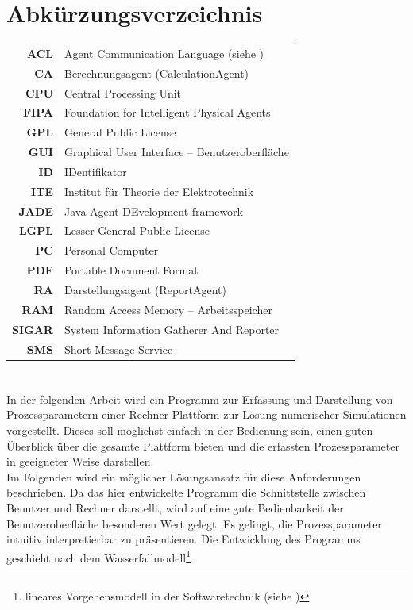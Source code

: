 \documentclass[a4paper,12pt,oneside,openright,onecolumn,final,titlepage,fleqn,ngerman]{scrreprt}
\newcommand{\parag}{\\[2ex]}
\newcommand{\abkEntry}[2]{\textbf{#1} & #2\\}
\newcommand{\calcag}{Berechnungsagent}
\newcommand{\repag}{Darstellungsagent}
\begin{document}
	\chapter*{Abkürzungsverzeichnis}
	\begin{longtable}{rl}
		\abkEntry{ACL}{Agent Communication Language (siehe \citeRefs{jade})}
		\abkEntry{CA}{\calcag{} (CalculationAgent)}
		\abkEntry{CPU}{Central Processing Unit}
		\abkEntry{FIPA}{Foundation for Intelligent Physical Agents}
		\abkEntry{GPL}{General Public License}
		\abkEntry{GUI}{Graphical User Interface -- Benutzeroberfläche}
		\abkEntry{ID}{IDentifikator}
		\abkEntry{ITE}{Institut für Theorie der Elektrotechnik}
		\abkEntry{JADE}{Java Agent DEvelopment framework}
		\abkEntry{LGPL}{Lesser General Public License}
		\abkEntry{PC}{Personal Computer}
		\abkEntry{PDF}{Portable Document Format}
		\abkEntry{RA}{\repag{} (ReportAgent)}
		\abkEntry{RAM}{Random Access Memory -- Arbeitsspeicher}
		\abkEntry{SIGAR}{System Information Gatherer And Reporter}
		\abkEntry{SMS}{Short Message Service}
	\end{longtable}

	\chapter*{\abstractname}
	In der folgenden Arbeit wird ein Programm zur Erfassung und Darstellung von Prozessparametern einer Rechner-Plattform zur Lösung numerischer Simulationen vorgestellt. Dieses soll möglichst einfach in der Bedienung sein, einen guten Überblick über die gesamte Plattform bieten und die erfassten Prozessparameter in geeigneter Weise darstellen.\parag{}
	Im Folgenden wird ein möglicher Lösungsansatz für diese Anforderungen beschrieben. Da das hier entwickelte Programm die Schnittstelle zwischen Benutzer und Rechner darstellt, wird auf eine gute Bedienbarkeit der Benutzeroberfläche besonderen Wert gelegt. Es gelingt, die Prozessparameter intuitiv interpretierbar zu präsentieren. Die Entwicklung des Programms geschieht nach dem Wasserfallmodell\footnote{lineares Vorgehensmodell in der Softwaretechnik (siehe )}.

	\clearpage		%
	\tableofcontents
	
	
\end{document}
